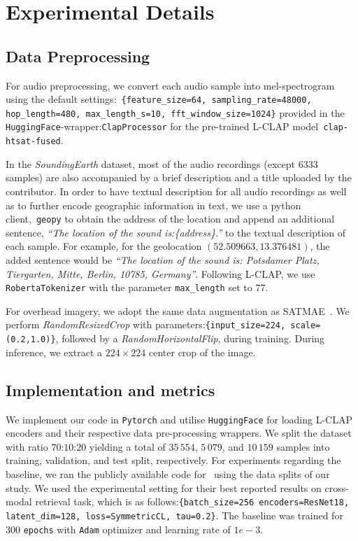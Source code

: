 \documentclass{bmvc2k}
\begin{document}
\newcommand{\cmark}{\ding{51}}\newcommand{\xmark}{\ding{55}}

\section{Experimental Details}
\subsection{Data Preprocessing}
For audio preprocessing, we convert each audio sample into mel-spectrogram using the default settings:~\texttt{\{feature\_size=64, sampling\_rate=48000, hop\_length=480, max\_length\_s=10, fft\_window\_size=1024\}} provided in the \texttt{HuggingFace}-wrapper:\texttt{ClapProcessor} for the pre-trained L-CLAP model~\texttt{clap-htsat-fused}.

In the {\em SoundingEarth} dataset, most of the audio recordings (except $6333$ samples) are also accompanied by a brief description and a title uploaded by the contributor. In order to have textual description for all audio recordings as well as to further encode geographic information in text, we use a python client,~\texttt{geopy} to obtain the address of the location and append an additional sentence, \emph{``The location of the sound is:\{address\}.''} to the textual description of each sample. For example, for the geolocation $(52.509663, 13.376481)$, the added sentence would be \emph{``The location of the sound is: Potsdamer Platz, Tiergarten, Mitte, Berlin, 10785, Germany''}. Following L-CLAP, we use \texttt{RobertaTokenizer} with the parameter \texttt{max\_length} set to $77$. 

For overhead imagery, we adopt the same data augmentation as SATMAE~\cite{cong2022satmae}. We perform \textit{RandomResizedCrop} with parameters:\texttt{\{input\_size=224, scale=(0.2,1.0)\}}, followed by a \textit{RandomHorizontalFlip}, during training. During inference, we extract a $224\times224$ center crop of the image.

\subsection{Implementation and metrics}
We implement our code in \texttt{Pytorch} and utilise \texttt{HuggingFace} for loading L-CLAP encoders and their respective data pre-processing wrappers.  We split the dataset with ratio $70$:$10$:$20$ yielding a total of $35\,554$, $5\,079$, and $10\,159$ samples into training, validation, and test split, respectively. For experiments regarding the baseline, we ran the publicly available code for~\cite{heidler2023self} using the data splits of our study. We used the experimental setting for their best reported results on cross-modal retrieval task, which is as follows:\texttt{\{batch\_size=256 encoders=ResNet18, latent\_dim=128, loss=SymmetricCL, tau=0.2\}}. The baseline was trained for $300$ \texttt{epochs} with \texttt{Adam} optimizer and learning rate of $1e-3$.
\end{document}
